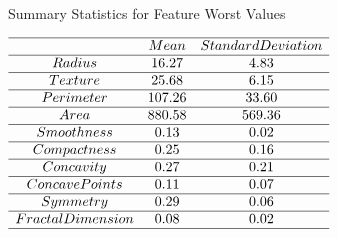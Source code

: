 \documentclass[conference]{IEEEtran}
\begin{document}
\begin{table}[ht]
    \caption{\\Summary Statistics for Feature Worst Values}
    $\begin{array}{ccc}
         \hline
         & Mean & Standard Deviation\\
         \hline
         Radius & 16.27 & 4.83\\
         \hline
         Texture & 25.68 & 6.15\\
         \hline
         Perimeter & 107.26 & 33.60\\
         \hline
         Area & 880.58 & 569.36\\
         \hline
         Smoothness & 0.13 & 0.02\\
         \hline
         Compactness & 0.25 & 0.16\\
         \hline
         Concavity & 0.27 & 0.21\\
         \hline
         Concave Points & 0.11 & 0.07\\
         \hline
         Symmetry & 0.29 & 0.06\\
         \hline
         Fractal Dimension & 0.08 & 0.02\\
         \hline
    \end{array}$
\end{table}
\end{document}
